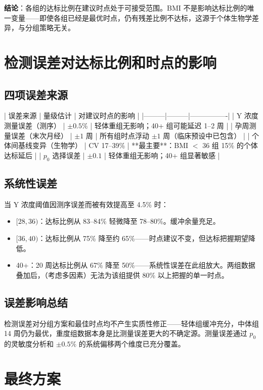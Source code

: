 \documentclass{internal-report}
\begin{document}
\textbf{结论}：各组的达标比例在建议时点处于可接受范围。BMI 不是影响达标比例的唯一变量——即使各组已经是最优时点，仍有残差比例不达标，这源于个体生物学差异，与分组策略无关。

\section{检测误差对达标比例和时点的影响}

\subsection{四项误差来源}

| 误差来源 | 量级估计 | 对建议时点的影响 |
|---------|---------|----------------|
| Y 浓度测量误差（测序） | $\pm 0.5\%$ | 轻体重组无影响；40+ 组可能延迟 1--2 周 |
| 孕周测量误差（末次月经） | $\pm 1$ 周 | 所有组时点浮动 $\pm 1$ 周（临床预设中已包含） |
| 个体间基线变异（生物学） | CV 17--39\% | **最主要**：BMI $<$ 36 组 15\% 的个体达标延后 |
| $p_0$ 选择误差 | $\pm 0.1$ | 轻体重组无影响；40+ 组显著敏感 |

\subsection{系统性误差}

当 Y 浓度阈值因测序误差而被有效提高至 4.5\% 时：

\begin{itemize}
    \item $[28,36)$：达标比例从 83--84\% 轻微降至 78--80\%。缓冲余量充足。
    \item $[36,40)$：达标比例从 75\% 降至约 65\%——时点建议不变，但达标把握期望降低。
    \item 40+：20 周达标比例从 67\% 降至 50\%——系统性误差在此组放大。两组数据叠加后，（考虑多因素）无法为该组提供 80\% 以上把握的单一时点。
\end{itemize}

\subsection{误差影响总结}

检测误差对分组方案和最佳时点均不产生实质性修正——轻体组缓冲充分，中体组 14 周仍为最优，重度组数据本身是比测量误差更大的不确定源。测量误差通过 $p_0$ 的灵敏度分析和 $\pm 0.5\%$ 的系统偏移两个维度已充分覆盖。

\section{最终方案}
\end{document}
